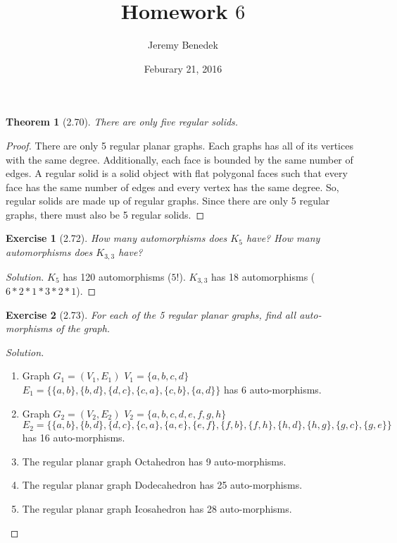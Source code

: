 \documentclass{article}
\title{Homework $6$}
\author{Jeremy Benedek}
\date{Feburary 21, 2016}
\newtheorem*{thm}{Theorem}
\newtheorem*{ex}{Exercise}
\newenvironment{solution}
  {\begin{proof}[Solution]}
  {\renewcommand{\qedsymbol}{}\end{proof}}
\begin{document}
\maketitle

\begin{thm}[2.70]
	There are only five regular solids.
\end{thm}
\begin{proof}
	There are only 5 regular planar graphs. Each graphs has all of its vertices with the same degree. Additionally, each face is bounded by the same number of edges. A regular solid is a solid object with 
	flat polygonal faces such that every face has the same number of edges and every vertex has the same degree. So, regular solids are made up of regular graphs. Since there are only 
	5 regular graphs, there must also be 5 regular solids. 
\end{proof}

\begin{ex}[2.72]
	How many automorphisms does $K_5$ have? How many automorphisms does $K_{3,3}$ have?
\end{ex}
\begin{solution}
	$K_5$ has 120 automorphisms ($5!$). $K_{3,3}$ has 18 automorphisms ($6*2*1*3*2*1$). 
\end{solution}

\begin{ex}[2.73]
	For each of the 5 regular planar graphs, find all auto-morphisms of the graph.
\end{ex}
\begin{solution}
	\begin{enumerate}
  	
	  \item Graph $G_1 = (V_1, E_1)$ $V_1 = \{a,b,c,d\}$ $E_1 = \{ \{a,b\}, \{b,d\}, \{d,c\}, \{c,a\}, \{c,b\}, \{a,d\} \}$ has 6 auto-morphisms.
	  \item Graph $G_2 = (V_2, E_2)$ $V_2 = \{a,b,c,d,e,f,g,h\}$ \\ $E_2 = \{ \{a,b\}, \{b,d\}, \{d,c\}, \{c,a\}, \{a,e\}, \{e,f\}, \{f,b\}, \{f,h\}, \{h,d\}, \{h,g\}, \{g,c\}, \{g,e\} \}$ has 16 auto-morphisms.
	  \item The regular planar graph Octahedron has 9 auto-morphisms.
	  \item The regular planar graph Dodecahedron has 25 auto-morphisms. 
	  \item The regular planar graph Icosahedron has 28 auto-morphisms.


	\end{enumerate}

\end{solution}
\end{document}
